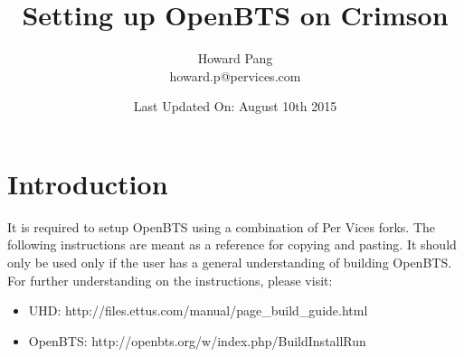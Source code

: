 \documentclass[11pt]{article}
\title{\textbf{Setting up OpenBTS on Crimson}}
\author{Howard Pang\\
	howard.p@pervices.com}
\date{Last Updated On: August 10th 2015}
\begin{document}
\maketitle

\section{Introduction}
It is required to setup OpenBTS using a combination of Per Vices forks. The following instructions are meant as a reference for copying and pasting. It should only be used only if the user has a general understanding of building OpenBTS. For further understanding on the instructions, please visit:
\begin{itemize}
	\item UHD: http://files.ettus.com/manual/page\_build\_guide.html
	\item OpenBTS: http://openbts.org/w/index.php/BuildInstallRun
\end{itemize}
\end{document}
